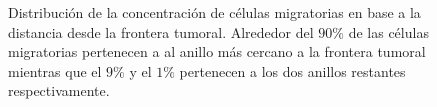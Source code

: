 \begin{figure}[!ht]
\begin{center}
\end{center}\vspace*{-0.5cm}
\caption[Distribuci\'on de la concentraci\'on de c\'elulas migratorias en base a la distancia desde la frontera tumoral]{Distribuci\'on de la concentraci\'on de c\'elulas migratorias en base a la distancia desde la frontera tumoral. Alrededor del $90\%$ de las c\'elulas migratorias pertenecen a al anillo m\'as cercano a la frontera tumoral mientras que el $9\%$ y el $1\%$ pertenecen a los dos anillos restantes respectivamente.}
\label{fig-sun}
\end{figure}

